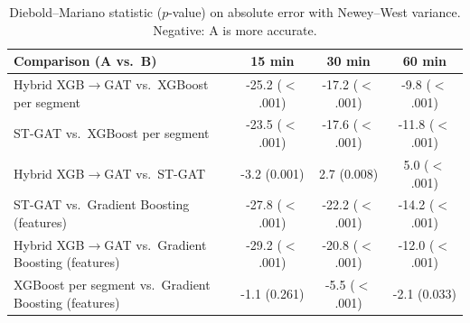 \begin{table}[t]
\centering
\caption{Diebold--Mariano statistic ($p$-value) on absolute error with Newey--West variance. Negative: A is more accurate.}
\label{tab:p2dm}
\setlength{\tabcolsep}{3.5pt}
\begin{tabular}{lccc}
\toprule
Comparison (A vs.\ B) & 15 min & 30 min & 60 min \\
\midrule
Hybrid XGB$\to$GAT vs.\ XGBoost per segment & -25.2 ($<$.001) & -17.2 ($<$.001) & -9.8 ($<$.001) \\
ST-GAT vs.\ XGBoost per segment & -23.5 ($<$.001) & -17.6 ($<$.001) & -11.8 ($<$.001) \\
Hybrid XGB$\to$GAT vs.\ ST-GAT & -3.2 (0.001) & 2.7 (0.008) & 5.0 ($<$.001) \\
ST-GAT vs.\ Gradient Boosting (features) & -27.8 ($<$.001) & -22.2 ($<$.001) & -14.2 ($<$.001) \\
Hybrid XGB$\to$GAT vs.\ Gradient Boosting (features) & -29.2 ($<$.001) & -20.8 ($<$.001) & -12.0 ($<$.001) \\
XGBoost per segment vs.\ Gradient Boosting (features) & -1.1 (0.261) & -5.5 ($<$.001) & -2.1 (0.033) \\
\bottomrule
\end{tabular}
\end{table}
